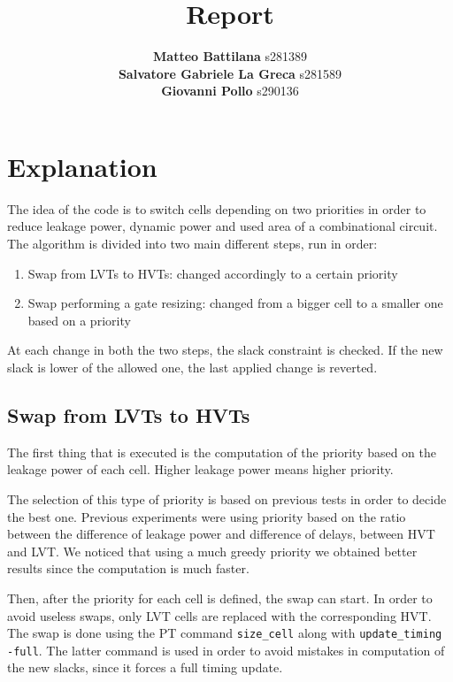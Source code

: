 \documentclass{article}
\title{\Huge Report}
\author{
	\large \textbf{Matteo Battilana} s281389 \\
	\large \textbf{Salvatore Gabriele La Greca} s281589 \\
	\large \textbf{Giovanni Pollo} s290136}
\date{}
\begin{document}
		\begin{titlepage}
			\centering
			\vspace{2px}
		\end{titlepage}
		\maketitle
		\thispagestyle{empty}
		
		\newpage
		
		\thispagestyle{empty}
		
		\section{Explanation}
		
		The idea of the code is to switch cells depending on two priorities in order to reduce leakage power, dynamic power and used area of a combinational circuit. The algorithm is divided into two main different steps, run in order:
		
		\begin{enumerate}
			\itemsep0sp
			\item Swap from LVTs to HVTs: changed accordingly to a certain priority 
			\item Swap performing a gate resizing: changed from a bigger cell to a smaller one based on a priority
		\end{enumerate}
		
		At each change in both the two steps, the slack constraint is checked. If the new slack is lower of the allowed one, the last applied change is reverted.
		
		
		\subsection{Swap from LVTs to HVTs}
		
		The first thing that is executed is the computation of the priority based on the leakage power of each cell. Higher leakage power means higher priority.
		
		The selection of this type of priority is based on previous tests in order to decide the best one. Previous experiments were using priority based on the ratio between the difference of leakage power and difference of delays, between HVT and LVT. We noticed that using a much greedy priority we obtained better results since the computation is much faster.   
		
		Then, after the priority for each cell is defined, the swap can start. In order to avoid useless swaps, only LVT cells are replaced with the corresponding HVT. The swap is done using the PT command \texttt{size\_cell} along with \texttt{update\_timing -full}. The latter command is used in order to avoid mistakes in computation of the new slacks, since it forces a full timing update. 
		
\end{document}
